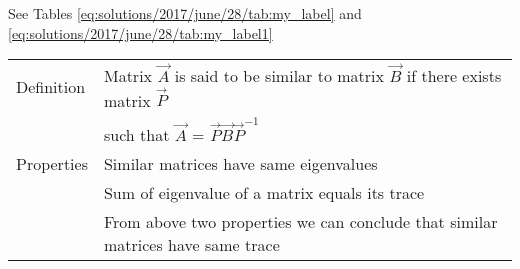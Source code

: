See Tables     \ref{eq:solutions/2017/june/28/tab:my_label}
and     \ref{eq:solutions/2017/june/28/tab:my_label1}

\begin{table*}[ht!]
\begin{center}
\begin{tabular}{|m{2cm}|m{6cm}|}\hline
        Definition & Matrix $\vec{A}$ is said to be similar to matrix $\vec{B}$ if there exists matrix $\vec{P}$\\& such that $\vec{A}$ = $\vec{P}\vec{B}\vec{P}^{-1}$\\
        \hline
        Properties& Similar matrices have same eigenvalues\\&
        Sum of eigenvalue of a matrix equals its trace\\&
        From above two properties we can conclude that similar matrices have same trace\\
        \hline
\end{tabular}
\end{center}
\caption{Similar matrices and Properties}
\label{eq:solutions/2017/june/28/tab:my_label}
\end{table*}
